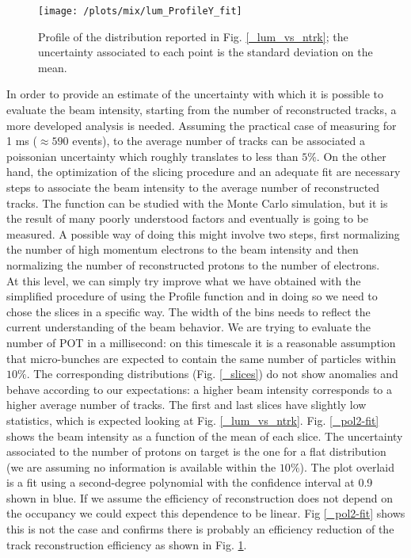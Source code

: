 \documentclass[12pt,a4paper,openright, oneside, titlepage]{book} %
\begin{document}
\begin{figure}[!htb]
\centering
\texttt{[image: /plots/mix/lum\_ProfileY\_fit]}
\caption[Protons on target and number of tracks \[ProfileY()\]]
{Profile of the distribution reported in Fig. \ref{_lum_vs_ntrk}; 
the uncertainty associated to each point is the standard deviation on the mean.}
\label{_lum_ProfileY}
\end{figure}

\noindent In order to provide an estimate of the uncertainty with which it is possible to evaluate the beam intensity, starting from the number of reconstructed tracks, a more developed analysis is needed.
Assuming the practical case of measuring for 1 ms ($\approx590$ events), to the average number of tracks can be associated a poissonian uncertainty which roughly translates to less than $5\%$. 
On the other hand, the optimization of the slicing procedure and an adequate fit are necessary steps to associate the beam intensity to the average number of reconstructed tracks.
The function can be studied with the Monte Carlo simulation, but it is the result of many poorly understood factors and eventually is going to be measured.
A possible way of doing this might involve two steps, first normalizing the number of high momentum electrons to the beam intensity and then normalizing the number of reconstructed protons to the number of electrons.\\

\noindent At this level, we can simply try improve what we have obtained with the simplified procedure of using the Profile function and in doing so we need to chose the slices in a specific way. 
The width of the bins needs to reflect the current understanding of the beam behavior.
We are trying to evaluate the number of POT in a millisecond: on this timescale it is a reasonable assumption that micro-bunches are expected to contain the same number of particles within $10\%$. 
The corresponding distributions (Fig. \ref{_slices}) do not show anomalies and behave according to our expectations: a higher beam intensity corresponds to a higher average number of tracks.
The first and last slices have slightly low statistics, which is expected looking at Fig. \ref{_lum_vs_ntrk}.
Fig. \ref{_pol2-fit} shows the beam intensity as a function of the mean of each slice. 
The uncertainty associated to the number of protons on target is the one for a flat distribution (we are assuming no information is available within the $10\%$).
The plot overlaid is a fit using a second-degree polynomial with the confidence interval at 0.9 shown in blue. 
If we assume the efficiency of reconstruction does not depend on the occupancy we could expect this dependence to be linear. 
Fig \ref{_pol2-fit} shows this is not the case and confirms there is probably an efficiency reduction of the track reconstruction efficiency as shown in Fig. \ref{_lum_ProfileY}.\\
\end{document}
